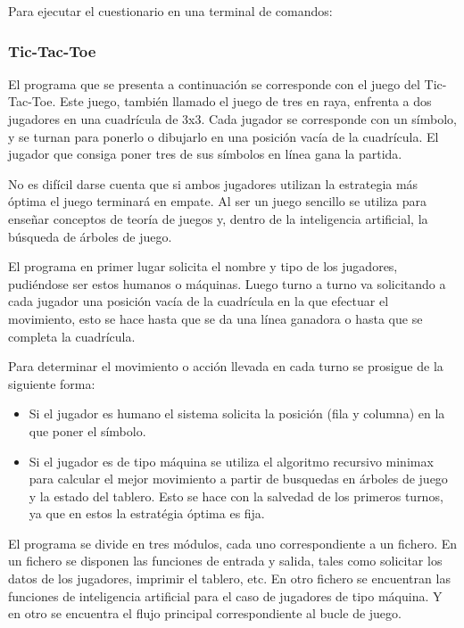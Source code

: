Para ejecutar el cuestionario en una terminal de comandos:


\subsubsection {Tic-Tac-Toe}
El programa que se presenta a continuación se corresponde con el juego del Tic-Tac-Toe. Este juego, también llamado 
el juego de tres en raya, enfrenta a dos jugadores en una cuadrícula de 3x3. Cada jugador se corresponde con un símbolo, y
se turnan para ponerlo o dibujarlo en una posición vacía de la cuadrícula. El jugador que consiga poner tres de sus símbolos en línea
gana la partida. 

No es difícil darse cuenta que si ambos jugadores utilizan la estrategia más óptima el juego terminará en empate. Al ser un juego sencillo se 
utiliza para enseñar conceptos de teoría de juegos y, dentro de la inteligencia artificial, la búsqueda de árboles de juego.

El programa en primer lugar solicita el nombre y tipo de los jugadores, pudiéndose ser estos humanos o máquinas. Luego turno a turno va solicitando 
a cada jugador una posición vacía de la cuadrícula en la que efectuar el movimiento, esto se hace hasta que se da una línea ganadora o hasta que se
completa la cuadrícula. 

Para determinar el movimiento o acción llevada en cada turno se prosigue de la siguiente forma:
\begin{itemize} 
\item Si el jugador es humano el sistema solicita la posición (fila y columna) en la que poner el símbolo. 
\item Si el jugador es de tipo máquina se utiliza el algoritmo recursivo minimax para calcular el mejor 
movimiento a partir de busquedas en árboles de juego y la estado del tablero. Esto se hace con la salvedad de los primeros turnos, ya 
que en estos la estratégia óptima es fija.
\end{itemize}

El programa se divide en tres módulos, cada uno correspondiente a un fichero. En un fichero se disponen las funciones de entrada y salida, tales como
solicitar los datos de los jugadores, imprimir el tablero, etc. En otro fichero se encuentran las funciones de inteligencia artificial para el caso de 
jugadores de tipo máquina. Y en otro se encuentra el flujo principal correspondiente al bucle de juego.

